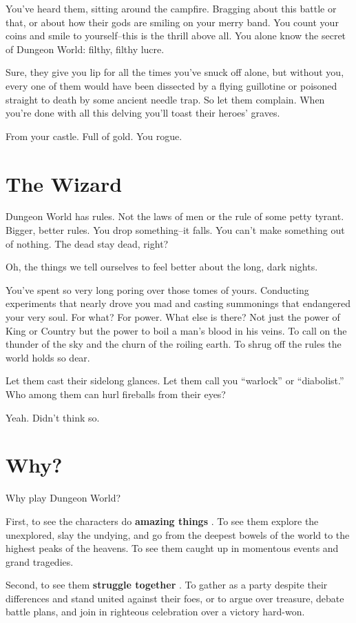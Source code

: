  You've heard them, sitting around the campfire. Bragging about this battle or that, or about how their gods are smiling on your merry band. You count your coins and smile to yourself--this is the thrill above all. You alone know the secret of Dungeon World: filthy, filthy lucre.


 Sure, they give you lip for all the times you've snuck off alone, but without you, every one of them would have been dissected by a flying guillotine or poisoned straight to death by some ancient needle trap. So let them complain. When you're done with all this delving you'll toast their heroes' graves.


 From your castle. Full of gold. You rogue.
\section{The Wizard}


 Dungeon World has rules. Not the laws of men or the rule of some petty tyrant. Bigger, better rules. You drop something--it falls. You can't make something out of nothing. The dead stay dead, right?


 Oh, the things we tell ourselves to feel better about the long, dark nights.


 You've spent so very long poring over those tomes of yours. Conducting experiments that nearly drove you mad and casting summonings that endangered your very soul. For what? For power. What else is there? Not just the power of King or Country but the power to boil a man's blood in his veins. To call on the thunder of the sky and the churn of the roiling earth. To shrug off the rules the world holds so dear.


 Let them cast their sidelong glances. Let them call you ``warlock'' or ``diabolist.'' Who among them can hurl fireballs from their eyes?


 Yeah. Didn't think so.
\section{Why?}


 Why play Dungeon World?


 First, to see the characters do \textbf{amazing things}
. To see them explore the unexplored, slay the undying, and go from the deepest bowels of the world to the highest peaks of the heavens. To see them caught up in momentous events and grand tragedies.


 Second, to see them \textbf{struggle together}
. To gather as a party despite their differences and stand united against their foes, or to argue over treasure, debate battle plans, and join in righteous celebration over a victory hard-won.


